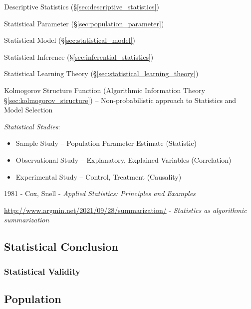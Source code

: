 Descriptive Statistics (\S\ref{sec:descriptive_statistics})

Statistical Parameter (\S\ref{sec:population_parameter})

Statistical Model (\S\ref{sec:statistical_model})

Statistical Inference (\S\ref{sec:inferential_statistics})

Statistical Learning Theory (\S\ref{sec:statistical_learning_theory})

Kolmogorov Structure Function (Algorithmic Information Theory
\S\ref{sec:kolmogorov_structure}) -- Non-probabilistic approach to Statistics
and Model Selection

\emph{Statistical Studies}:
\begin{itemize}
  \item Sample Study -- Population Parameter Estimate (Statistic)
  \item Observational Study -- Explanatory, Explained Variables (Correlation)
  \item Experimental Study -- Control, Treatment (Causality)
\end{itemize}

1981 - Cox, Snell - \emph{Applied Statistics: Principles and Examples}

\url{http://www.argmin.net/2021/09/28/summarization/} -
\emph{Statistics as algorithmic summarization}



\subsection{Statistical Conclusion}\label{sec:statistical_conclusion}

\subsubsection{Statistical Validity}\label{sec:statistical_validity}\hfill



\subsection{Population}\label{sec:population}

